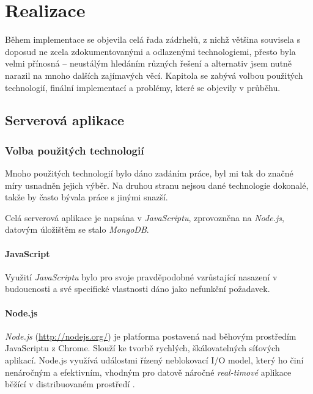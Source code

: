 \chapter{Realizace}
Během implementace se objevila celá řada zádrhelů, z nichž většina souvisela s doposud ne zcela zdokumentovanými a odlazenými technologiemi, přesto byla velmi přínosná -- neustálým hledáním různých řešení a alternativ jsem nutně narazil na mnoho dalších zajímavých věcí. Kapitola se zabývá volbou použitých technologií, finální implementací a problémy, které se objevily v průběhu.

\section{Serverová aplikace}


\subsection{Volba použitých technologií}
Mnoho použitých technologií bylo dáno zadáním práce, byl mi tak do značné míry usnadněn jejich výběr. Na druhou stranu nejsou dané technologie dokonalé, takže by často bývala práce s jinými snazší.

Celá serverová aplikace je napsána v \emph{JavaScriptu}, zprovozněna na \emph{Node.js}, datovým úložištěm se stalo \emph{MongoDB}.

\subsubsection{JavaScript}
Využití \emph{JavaScriptu} bylo pro svoje pravděpodobné vzrůstající nasazení v budoucnosti a své specifické vlastnosti dáno jako nefunkční požadavek.

\subsubsection{Node.js}
\emph{Node.js} (\url{http://nodejs.org/}) je platforma postavená nad běhovým prostředím JavaScriptu z Chrome. Slouží ke tvorbě rychlých, škálovatelných síťových aplikací. Node.js využívá událostmi řízený neblokovací I/O model, který ho činí nenáročným a efektivním, vhodným pro datově náročné \textit{real-timové} aplikace běžící v distribuovaném prostředí \cite{Node}.

